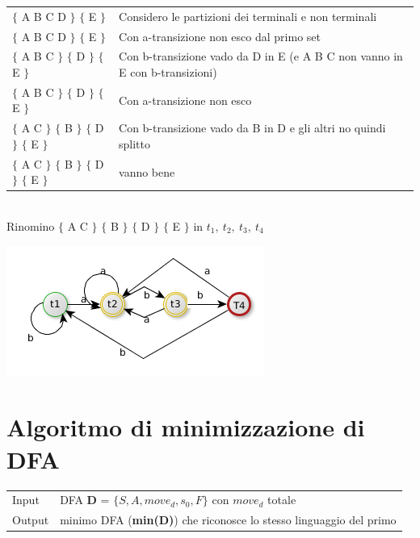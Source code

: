 \begin{tabular}{ll}
    $\{$ A B C D $\}$ $\{$ E $\}$                       & Considero le partizioni dei terminali e non terminali \\  
    $\{$ A B C D $\}$ $\{$ E $\}$                       & Con a-transizione non esco dal primo set\\  
    $\{$ A B C $\}$ $\{$ D $\}$ $\{$ E $\}$             & Con b-transizione vado da D in E (e A B C non vanno in E con b-transizioni)\\  
    $\{$ A B C $\}$ $\{$ D $\}$ $\{$ E $\}$             & Con a-transizione non esco\\    
    $\{$ A C $\}$ $\{$ B $\}$ $\{$ D $\}$ $\{$ E $\}$   & Con b-transizione vado da B in D e gli altri no quindi splitto \\
    $\{$ A C $\}$ $\{$ B $\}$ $\{$ D $\}$ $\{$ E $\}$   & vanno bene \\
\end{tabular}\\[5pt]

Rinomino  $\{$ A C $\}$ $\{$ B $\}$ $\{$ D $\}$ $\{$ E $\}$ in $t_1,\ t_2,\ t_3,\ t_4 $

\begin{center}
	\includegraphics[scale=0.5]{Chapters/Img/c02_06.png}\\
\end{center} 

\section{Algoritmo di minimizzazione di DFA}
\begin{center}
    \begin{tabular}{ll}
        Input   &   DFA \textbf{D} = $\{ S,A,move_d, s_0, F\}$ con $move_d$ totale\\
        Output  &   minimo DFA (\textbf{min(D)}) che riconosce lo stesso linguaggio del primo\\ 
    \end{tabular}
\end{center}

